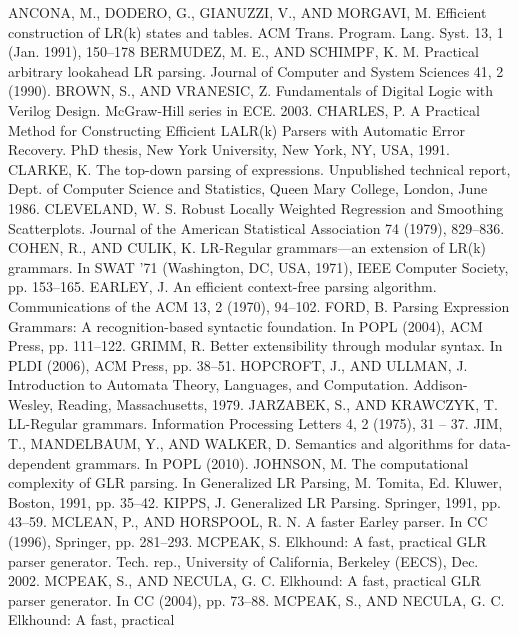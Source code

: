 ﻿%
\begin{thebibliography}{99}
ANCONA, M., DODERO, G., GIANUZZI, V., AND MORGAVI,
M. Efficient construction of LR(k) states and tables. ACM
Trans. Program. Lang. Syst. 13, 1 (Jan. 1991), 150–178
BERMUDEZ, M. E., AND SCHIMPF, K. M. Practical arbitrary
lookahead LR parsing. Journal of Computer and System Sciences
41, 2 (1990).
BROWN, S., AND VRANESIC, Z. Fundamentals of Digital Logic
with Verilog Design. McGraw-Hill series in ECE. 2003.
CHARLES, P. A Practical Method for Constructing Efficient
LALR(k) Parsers with Automatic Error Recovery. PhD thesis,
New York University, New York, NY, USA, 1991.
CLARKE, K. The top-down parsing of expressions. Unpublished
technical report, Dept. of Computer Science and Statistics,
Queen Mary College, London, June 1986.
CLEVELAND, W. S. Robust Locally Weighted Regression and
Smoothing Scatterplots. Journal of the American Statistical
Association 74 (1979), 829–836.
COHEN, R., AND CULIK, K. LR-Regular grammars—an extension
of LR(k) grammars. In SWAT ’71 (Washington, DC, USA,
1971), IEEE Computer Society, pp. 153–165.
EARLEY, J. An efficient context-free parsing algorithm. Communications
of the ACM 13, 2 (1970), 94–102.
FORD, B. Parsing Expression Grammars: A recognition-based
syntactic foundation. In POPL (2004), ACM Press, pp. 111–122.
GRIMM, R. Better extensibility through modular syntax. In
PLDI (2006), ACM Press, pp. 38–51.
HOPCROFT, J., AND ULLMAN, J. Introduction to Automata Theory,
Languages, and Computation. Addison-Wesley, Reading,
Massachusetts, 1979.
JARZABEK, S., AND KRAWCZYK, T. LL-Regular grammars.
Information Processing Letters 4, 2 (1975), 31 – 37.
JIM, T., MANDELBAUM, Y., AND WALKER, D. Semantics and
algorithms for data-dependent grammars. In POPL (2010).
JOHNSON, M. The computational complexity of GLR parsing.
In Generalized LR Parsing, M. Tomita, Ed. Kluwer, Boston,
1991, pp. 35–42.
KIPPS, J. Generalized LR Parsing. Springer, 1991, pp. 43–59.
MCLEAN, P., AND HORSPOOL, R. N. A faster Earley parser. In
CC (1996), Springer, pp. 281–293.
MCPEAK, S. Elkhound: A fast, practical GLR parser generator.
Tech. rep., University of California, Berkeley (EECS), Dec.
2002.
MCPEAK, S., AND NECULA, G. C. Elkhound: A fast, practical
GLR parser generator. In CC (2004), pp. 73–88.
MCPEAK, S., AND NECULA, G. C. Elkhound: A fast, practical

\end{thebibliography}
